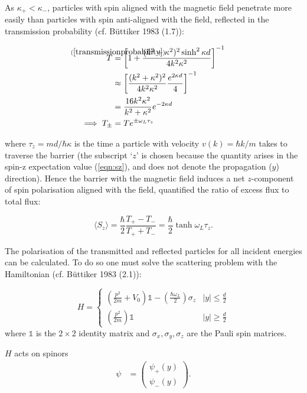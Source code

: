 \documentclass{article}
\begin{document}
\noindent As $\kappa_{+} < \kappa_{-}$, particles with spin aligned with the magnetic field penetrate more easily than particles with spin anti-aligned with the field, reflected in the transmission probability (cf. B{\"u}ttiker 1983 (1.7)):

\begin{align}
	T &\stackrel{\mathclap{(\ref{transmissionprobability})}}{=} \left[1+\frac{(k^2+\kappa^2)^2\sinh^2{\kappa d}}{4k^2\kappa^2}\right]^{-1}\\
	  &\approx \left[\frac{(k^2+\kappa^2)^2}{4k^2\kappa^2}\frac{e^{2\kappa d}}{4}\right]^{-1} \\
	&= \frac{16k^2\kappa^2}{k^2+\kappa^2}e^{-2\kappa d} \\
	\implies T_{\pm} &= Te^{\pm\omega_L \tau_z} 
\end{align}

\noindent where $\tau_z = md/\hbar\kappa$ is the time a particle with velocity $v(k) = \hbar k/m$ takes to traverse the barrier (the subscript `$z$' is chosen because the quantity arises in the spin-z expectation value (\ref{eqn:sz}), and does not denote the propagation ($y$) direction). Hence the barrier with the magnetic field induces a net $z$-component of spin polarisation aligned with the field, quantified the ratio of excess flux to total flux:

\begin{equation}
	\langle S_z \rangle = \frac{\hbar}{2}\frac{T_{+}-T_{-}}{T_{+}+T_{-}} = \frac{\hbar}{2}\tanh{\omega_L\tau_z}.
	\label{eqn:sz}
\end{equation}

\noindent The polarisation of the transmitted and reflected particles for all incident energies can be calculated. To do so one must solve the scattering problem with the Hamiltonian (cf. B{\"u}ttiker 1983 (2.1)):

\begin{equation}
	H = 
	\begin{cases}
	\left(\frac{p^2}{2m} + V_0\right)\mathbb{1}-\left(\frac{\hbar \omega_L}{2}\right) \sigma_z & |y| \leq \frac{d}{2}\\
	\left(\frac{p^2}{2m}\right)\mathbb{1} & |y| \geq \frac{d}{2}
	\end{cases}
	\end{equation}
where $\mathbb{1}$ is the $2 \times 2$ identity matrix and $\sigma_{x}, \sigma_{y}, \sigma_{z}$ are the Pauli spin matrices.

\noindent $H$ acts on spinors
\begin{align}
	\psi &= \begin{pmatrix}
		\psi_{+}(y) \\
		\psi_{-}(y)
		\end{pmatrix}.
\end{align}
\end{document}
